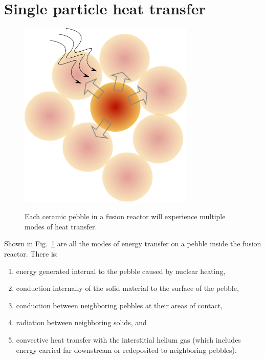 \section{Single particle heat transfer}

\begin{figure}[t]
	\centering
	\caption{Each ceramic pebble in a fusion reactor will experience multiple modes of heat transfer.}
	\includegraphics[width=0.75\textwidth]{chapters/figures/pebble-complete-heat-transfer}\label{fig:peb-comp-ht}
\end{figure}

Shown in Fig.~\ref{fig:peb-comp-ht} are all the modes of energy transfer on a pebble inside the fusion reactor. There is:

\begin{enumerate}
\item energy generated internal to the pebble caused by nuclear heating,
\item conduction internally of the solid material to the surface of the pebble, 
\item conduction between neighboring pebbles at their areas of contact, 
\item radiation between neighboring solids, and 
\item convective heat transfer with the interstitial helium gas (which includes energy carried far downstream or redeposited to neighboring pebbles).
\end{enumerate}









